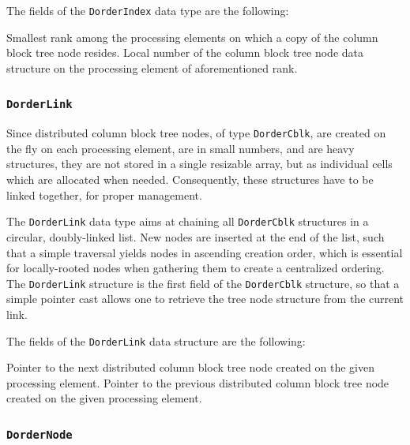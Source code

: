 The fields of the \texttt{DorderIndex} data type are the following:
\begin{itemize}
  Smallest rank among the processing elements on which a copy of the
  column block tree node resides.
  Local number of the column block tree node data structure on the
  processing element of aforementioned rank.
\end{itemize}

\subsubsection{\texttt{DorderLink}}
\label{sec-data-dorder-link}

Since distributed column block tree nodes, of type
\texttt{Dorder\lbt Cblk}, are created on the fly on each processing
element, are in small numbers, and are heavy structures, they are not
stored in a single resizable array, but as individual cells which are
allocated when needed. Consequently, these structures have to be
linked together, for proper management.

The \texttt{DorderLink} data type aims at chaining all
\texttt{Dorder\lbt Cblk} structures in a circular, doubly-linked
list. New nodes are inserted at the end of the list, such that a simple
traversal yields nodes in ascending creation order, which is essential
for locally-rooted nodes when gathering them to create a centralized
ordering. The \texttt{Dorder\lbt Link} structure is the first field of
the \texttt{Dorder\lbt Cblk} structure, so that a simple pointer cast
allows one to retrieve the tree node structure from the current link.

The fields of the \texttt{DorderLink} data structure are the following:
\begin{itemize}
  Pointer to the next distributed column block tree node created on
  the given processing element.
  Pointer to the previous distributed column block tree node created
  on the given processing element.
\end{itemize}

\subsubsection{\texttt{DorderNode}}
\label{sec-data-dorder-node}

